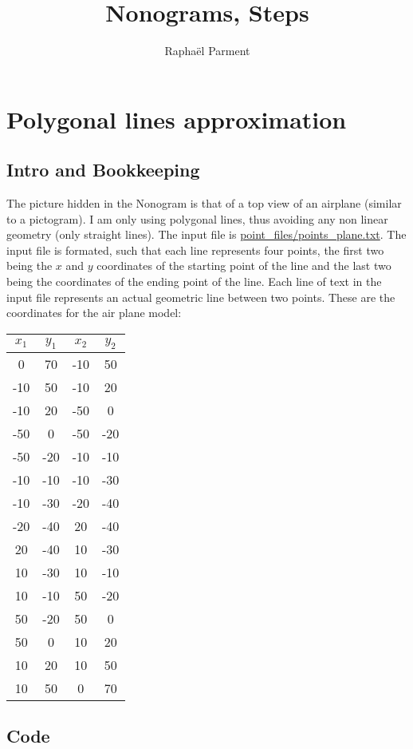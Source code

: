\documentclass{article}
\title{Nonograms, Steps}
\author{Raphaël Parment}
\begin{document}
\maketitle

\section{Polygonal lines approximation}
\subsection{Intro and Bookkeeping}
The picture hidden in the Nonogram is that of a top view of an airplane (similar to a pictogram). I am only using polygonal lines, thus avoiding any non linear geometry (only straight lines). The input file is \url{point_files/points_plane.txt}. The input file is formated, such that each line represents four points, the first two being the $x$ and $y$ coordinates of the starting point of the line and the last two being the coordinates of the ending point of the line. Each line of text in the input file represents an actual geometric line between two points. These are the coordinates for the air plane model: \\

\begin{tabular}{c|c|c|c}
$x_1$ & $y_1$ & $x_2$ & $y_2$\\ 
\hline
0 & 70 & -10 & 50\\
-10 & 50 & -10 & 20\\
-10 & 20 & -50 & 0\\
-50 & 0 & -50 & -20\\
-50 & -20 & -10 & -10\\
-10 & -10 & -10 & -30\\
-10 & -30 & -20 & -40\\
-20 & -40 & 20 & -40\\
20 & -40 & 10 & -30\\
10 & -30 & 10 & -10\\
10 & -10 & 50 & -20\\
50 & -20 & 50 & 0\\
50 & 0 & 10 & 20\\
10 & 20 & 10 & 50\\
10 & 50 & 0 & 70\\
\end{tabular}
\newline

\subsection{Code}
\end{document}
